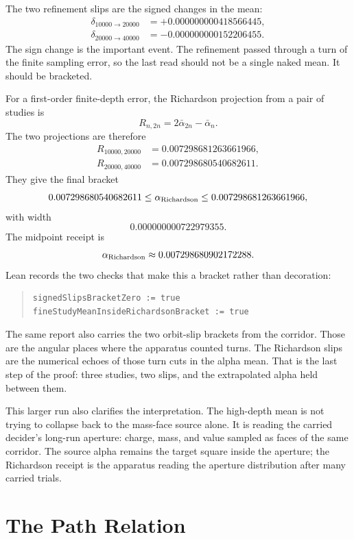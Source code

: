 The two refinement slips are the signed changes in the mean:
\[
\begin{aligned}
  \delta_{10000\to20000} &= +0.000000000418566445,\\
  \delta_{20000\to40000} &= -0.000000000152206455.
\end{aligned}
\]
The sign change is the important event. The refinement passed through a turn of the finite sampling error, so the
last read should not be a single naked mean. It should be bracketed.

For a first-order finite-depth error, the Richardson projection from a pair of studies is
\[
  R_{n,2n}=2\bar\alpha_{2n}-\bar\alpha_n.
\]
The two projections are therefore
\[
\begin{aligned}
  R_{10000,20000} &= 0.007298681263661966,\\
  R_{20000,40000} &= 0.007298680540682611.
\end{aligned}
\]
They give the final bracket
\[
  0.007298680540682611
  \leq
  \alpha_{\rm Richardson}
  \leq
  0.007298681263661966,
\]
with width
\[
  0.000000000722979355.
\]
The midpoint receipt is
\[
  \alpha_{\rm Richardson}
  \approx
  0.007298680902172288.
\]
Lean records the two checks that make this a bracket rather than decoration:
\begin{quote}\small
\begin{verbatim}
signedSlipsBracketZero := true
fineStudyMeanInsideRichardsonBracket := true
\end{verbatim}
\end{quote}
The same report also carries the two orbit-slip brackets from the corridor. Those are the angular places where
the apparatus counted turns. The Richardson slips are the numerical echoes of those turn cuts in the alpha mean.
That is the last step of the proof: three studies, two slips, and the extrapolated alpha held between them.

This larger run also clarifies the interpretation. The high-depth mean is not trying to collapse back to the
mass-face source alone. It is reading the carried decider's long-run aperture: charge, mass, and value sampled as
faces of the same corridor. The source alpha remains the target square inside the aperture; the Richardson receipt
is the apparatus reading the aperture distribution after many carried trials.

\section{The Path Relation}

